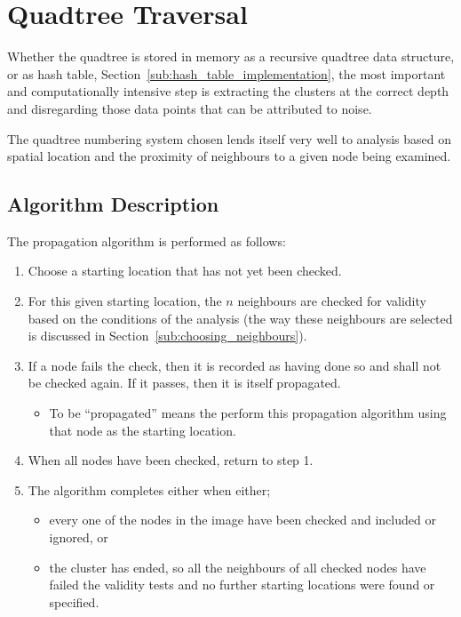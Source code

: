 
\section{Quadtree Traversal}
\label{sec:quadtree_traversal}

Whether the quadtree is stored in memory as a recursive quadtree data
structure, or as hash table, Section~\ref{sub:hash_table_implementation}, the
most important and computationally intensive step is extracting the clusters at
the correct depth and disregarding those data points that can be attributed to
noise.

The quadtree numbering system chosen lends itself very well to analysis based
on spatial location and the proximity of neighbours to a given node being
examined.

\subsection{Algorithm Description}
\label{sub:algorithm_description}

The propagation algorithm is performed as follows:
\begin{enumerate}
	\item Choose a starting location that has not yet been checked.
	\item For this given starting location, the $n$ neighbours are checked for
		validity based on the conditions of the analysis (the way these
		neighbours are selected is discussed in
		Section~\ref{sub:choosing_neighbours}).
	\item If a node fails the check, then it is recorded as having done so and
		shall not be checked again. If it passes, then it is itself propagated.
		\begin{itemize}
			\item To be ``propagated'' means the perform this propagation
				algorithm using that node as the starting location.
		\end{itemize}
	\item When all nodes have been checked, return to step 1.
	\item The algorithm completes either when either;
	\begin{itemize}
		\item every one of the nodes in the image have been checked and
			included or ignored, or
		\item the cluster has ended, so all the neighbours of all checked nodes
			have failed the validity tests and no further starting locations
			were found or specified.
	\end{itemize}
\end{enumerate}

